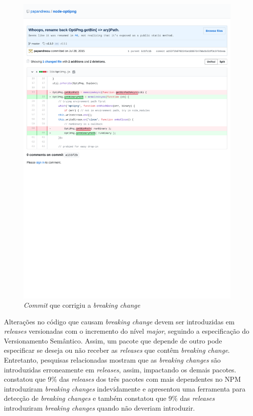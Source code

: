 \begin{figure}
    \centering
    \includegraphics[scale=0.65]{figuras/bc_example.pdf}
    \caption{\textit{Commit} que corrigiu a \textit{breaking change}}
    \label{fig:bc_optipng}
\end{figure}{}

Alterações no código que causam \textit{breaking change} devem ser introduzidas em \textit{releases} versionadas com o incremento do nível \textit{major}, seguindo a especificação do Versionamento Semântico. Assim, um pacote que depende de outro pode especificar se deseja ou não receber as \textit{releases} que contêm \textit{breaking change}. Entretanto, pesquisas relacionadas mostram que as \textit{breaking changes} são introduzidas erroneamente em \textit{releases}, assim, impactando os demais pacotes.  constatou que 9\% das \textit{releases} dos três pacotes com mais dependentes no NPM introduziram \textit{breaking changes} indevidamente e  apresentou uma ferramenta para detecção de \textit{breaking changes} e também constatou que 9\% das \textit{releases} introduziram \textit{breaking changes} quando não deveriam introduzir.

